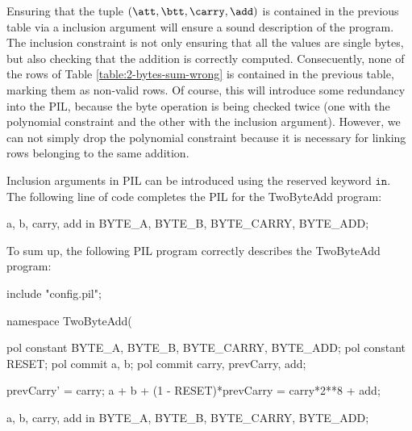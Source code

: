 Ensuring that the tuple $(\att, \btt, \carry, \add)$ is contained in the previous table via a inclusion argument will ensure a sound description of the program. The inclusion constraint is not only ensuring that all the values are single bytes, but also checking that the addition is correctly computed. Consecuently, none of the rows of Table \ref{table:2-bytes-sum-wrong} is contained in the previous table, marking them as non-valid rows. Of course, this will introduce some redundancy into the PIL, because the byte operation is being checked twice (one with the polynomial constraint and the other with the inclusion argument). However, we can not simply drop the polynomial constraint because it is necessary for linking rows belonging to the same addition. 

Inclusion arguments in PIL can be introduced using the reserved keyword $\mathtt{in}$. The following line of code completes the PIL for the \textsf{TwoByteAdd} program:
\begin{pil}
{a, b, carry, add} in {BYTE_A, BYTE_B, BYTE_CARRY, BYTE_ADD};
\end{pil}


    

To sum up, the following PIL program correctly describes the \textsf{TwoByteAdd} program:
\begin{pil}
include "config.pil";

namespace TwoByteAdd(%

    pol constant BYTE_A, BYTE_B, BYTE_CARRY, BYTE_ADD;
    pol constant RESET;
    pol commit a, b;
    pol commit carry, prevCarry, add;

    prevCarry' = carry;
    a + b + (1 - RESET)*prevCarry = carry*2**8 + add;

    {a, b, carry, add} in {BYTE_A, BYTE_B, BYTE_CARRY, BYTE_ADD};
\end{pil}

